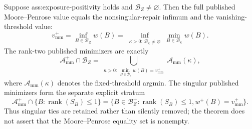 Suppose ass:exposure-positivity holds and \(\mathcal B_Z\ne\varnothing\).  Then the full published Moore--Penrose value equals the nonsingular-repair infimum and the vanishing-threshold value:
\[
 v_{\mathrm{mm}}^+
 =\inf_{B\in\mathcal B_Z}w(B)
 =\inf_{\substack{\kappa>0:\,\mathcal B_\kappa\ne\varnothing}}
   \min_{B\in\mathcal B_\kappa}w(B).
\]
The rank-two published minimizers are exactly
\[
 \mathcal A_{\mathrm{mm}}^+\cap\mathcal B_Z
 =\bigcup_{\substack{\kappa>0:\,
 \min_{B\in\mathcal B_\kappa}w(B)=v_{\mathrm{mm}}^+}}
 \mathcal A_{\mathrm{mm}}(\kappa),
\]
where \(\mathcal A_{\mathrm{mm}}(\kappa)\) denotes the fixed-threshold argmin.  The singular published minimizers form the separate explicit stratum
\[
 \mathcal A_{\mathrm{mm}}^+\cap\{B:\operatorname{rank}(S_B)\le1\}
 =\{B\in\mathcal B_Z^+:\operatorname{rank}(S_B)\le1, w^+(B)=v_{\mathrm{mm}}^+\}.
\]
Thus singular ties are retained rather than silently removed; the theorem does not assert that the Moore--Penrose equality set is nonempty.